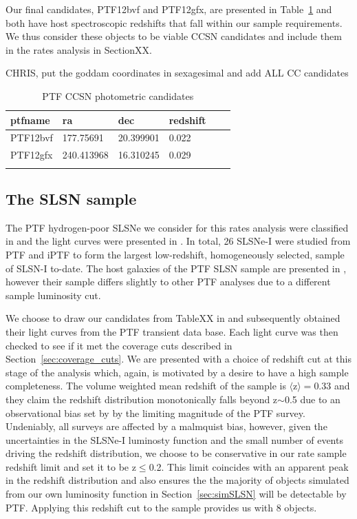 \documentclass[a4paper,fleqn,usenatbib]{mnras}
\newcommand{\chris}[1]{\color{orange}#1\color{black}}
\begin{document}
Our final candidates, PTF12bvf and PTF12gfx, are presented in Table~\ref{tab:photCCproperties} and both have host spectroscopic redshifts that fall within our sample requirements. We thus consider these objects to be viable CCSN candidates and include them in the rates analysis in SectionXX.

\begin{table}
    \caption{PTF CCSN photometric candidates }
    \centering
    \chris{CHRIS, put the goddam coordinates in sexagesimal and add ALL CC candidates}\\
	\begin{tabular}{l l l l l l} 
		\hline

ptfname &     ra     &    dec     & redshift  \\
		\hline
 PTF12bvf   &  177.75691 &  20.399901 & 0.022  \\
 PTF12gfx   & 240.413968 &  16.310245 &    0.029 \\
 
 		\hline
		\label{tab:photCCproperties}
	\end{tabular}
 \end{table}


\subsection{The SLSN sample}
\label{SLSN_sample}

The PTF hydrogen-poor SLSNe we consider for this rates analysis were classified in \citet{Quimby2013} and the light curves were presented in \citet{DeCia2017}. In total, 26 SLSNe-I were studied from PTF and iPTF to form the largest low-redshift, homogeneously selected, sample of SLSN-I to-date. The host galaxies of the PTF SLSN sample are presented in \citet{Perley2016}, however their sample differs slightly to other PTF analyses due to a different sample luminosity cut.

We choose to draw our candidates from TableXX in \citet{DeCia2017} and subsequently obtained their light curves from the PTF transient data base. Each light curve was then checked to see if it met the coverage cuts described in Section~\ref{sec:coverage_cuts}. We are presented with a choice of redshift cut at this stage of the analysis which, again, is motivated by a desire to have a high sample completeness. The volume weighted mean redshift of the \citet{DeCia2017} sample is $\langle \mathrm{z} \rangle = 0.33$ and they claim the redshift distribution monotonically falls beyond z${\sim}$0.5 due to an observational bias set by by the limiting magnitude of the PTF survey. Undeniably, all surveys are affected by a malmquist bias, however, given the uncertainties in the SLSNe-I luminosty function and the small number of events driving the redshift distribution, we choose to be conservative in our rate sample redshift limit and set it to be z${\le}$0.2. This limit coincides with an apparent peak in the \citet{DeCia2017} redshift distribution and also ensures the the majority of objects simulated from our own luminosity function in Section~\ref{sec:simSLSN} will be detectable by PTF. Applying this redshift cut to the \citet{DeCia2017} sample provides us with 8 objects.
\end{document}
